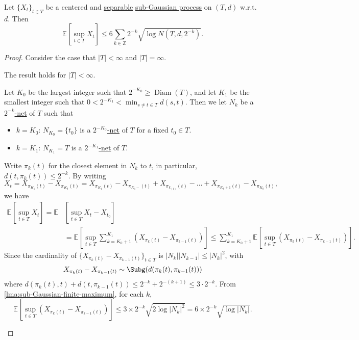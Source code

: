 \begin{theorem}\label{thm:Dudley-entropy-bound}
	Let \(\{ X_t \} _{t\in T}\) be a centered and \hyperref[def:separable]{separable} \hyperref[def:sub-Gaussian-process]{sub-Gaussian process} on \((T, d)\) w.r.t.\ \(d\). Then
	\[
		\mathbb{E}_{}\left[\sup _{t\in T} X_t \right] \leq 6 \sum_{k\in \mathbb{Z} } 2^{-k} \sqrt{\log N(T, d, 2^{-k})} .
	\]
\end{theorem}
\begin{proof}
	Consider the case that \(\vert T \vert < \infty \) and \(\vert T \vert = \infty \).

	\begin{claim}
		The result holds for \(\vert T \vert < \infty \).
	\end{claim}
	\begin{explanation}
		Let \(K_0\) be the largest integer such that \(2^{-K_0} \geq \mathop{\mathrm{Diam}}(T) \), and let \(K_1\) be the smallest integer such that \(0 < 2^{-K_1} < \min _{s \neq t\in T} d(s, t)\). Then we let \(N_k\) be a \hyperref[def:eps-net]{\(2^{-k}\)-net} of \(T\) such that
		\begin{itemize}
			\item \(k = K_0\): \(N_{K_0} = \{ t_0 \} \) is a \hyperref[def:eps-net]{\(2^{-K_0}\)-net} of \(T\) for a fixed \(t_0\in T\).
			\item \(k = K_1\): \(N_{K_1} = T\) is a \hyperref[def:eps-net]{\(2^{-K_1}\)-net} of \(T\).
		\end{itemize}
		Write \(\pi _k(t)\) for the closest element in \(N_k\) to \(t\), in particular, \(d(t, \pi _k(t)) \leq 2^{-k}\). By writing
		\[
			X_t
			= X_{\pi _{K_1} (t)} - X_{\pi _{K_0} (t)}
			= X_{\pi _{K_1}(t)} - X_{\pi _{K_1 - } (t)} + X_{\pi _{k_{(1)}} (t)} - \dots + X_{\pi _{K_0 + 1} (t)} - X_{\pi _{K_0} (t)},
		\]
		we have
		\[
			\begin{split}
				\mathbb{E}_{}\left[\sup _{t\in T} X_t \right]
				= \mathbb{E}_{}&\left[\sup _{t\in T} X_t - X_{t_0} \right]\\
				&= \mathbb{E}_{}\left[\sup _{t\in T} \sum_{k=K_0 + 1}^{K_1} \left( X_{\pi _k (t)} - X_{\pi _{k-1}(t)} \right) \right]
				\leq \sum_{k=K_0 + 1}^{K_1} \mathbb{E}_{}\left[\sup _{t\in T} \left( X_{\pi _k(t)} - X_{\pi _{k-1} (t)} \right) \right].
			\end{split}
		\]
		Since the cardinality of \(\{ X_{\pi _k(t)} - X_{\pi _{k-1} (t)} \}_{t\in T}\) is \(\vert N_k \vert \vert N_{k-1} \vert \leq \vert N_k \vert ^2\), with
		\[
			X_{\pi _k(t)} - X_{\pi _{k-1}(t)} \sim \Subg(d(\pi _k(t), \pi _{k-1}(t)))
		\]
		where \(d(\pi _k(t), t) + d(t, \pi _{k-1}(t)) \leq 2^{-k} + 2^{-(k+1)} \leq 3\cdot 2^{-k}\). From \autoref{lma:sub-Gaussian-finite-maximum}, for each \(k\),
		\[
			\mathbb{E}_{}\left[\sup _{t\in T} \left( X_{\pi _k(t)} - X_{\pi _{k-1}(t)} \right) \right]
			\leq 3 \times 2^{-k} \sqrt{2 \log \vert N_k \vert ^2}
			= 6 \times 2^{-k} \sqrt{\log \vert N_k \vert }.
		\]
	\end{explanation}


\end{proof}
